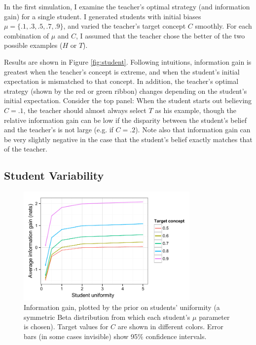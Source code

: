 \documentclass[10pt,letterpaper]{article}
\begin{document}
In the first simulation, I examine the teacher's optimal strategy (and information gain) for a single student. I generated students with initial biases $\mu= \{.1, .3, .5, .7, .9\}$, and varied the teacher's target concept $C$ smoothly. For each combination of $\mu$ and $C$, I assumed that the teacher chose the better of the two possible examples ($H$ or $T$). 

Results are shown in Figure \ref{fig:student}. Following intuitions, information gain is greatest when the teacher's concept is extreme, and when the student's initial expectation is mismatched to that concept. In addition, the teacher's optimal strategy (shown by the red or green ribbon) changes depending on the student's initial expectation. Consider the top panel: When the student starts out believing $C=.1$, the teacher should almost always select $T$ as his example, though the relative information gain can be low if the disparity between the student's belief and the teacher's is not large (e.g. if $C=.2$). Note also that information gain can be very slightly negative in the case that the student's belief exactly matches that of the teacher. %

\subsection{Student Variability}

\begin{figure}[t]
\begin{center}
\includegraphics[width=3.5in]{figures/student_uniformity.pdf}
\end{center}
\caption{\label{fig:uniformity} Information gain, plotted by the prior on students' uniformity (a symmetric Beta distribution from which each student's $\mu$ parameter is chosen). Target values for $C$ are shown in different colors. Error bars (in some cases invisible) show 95\% confidence intervals.}
\end{figure}
\end{document}
